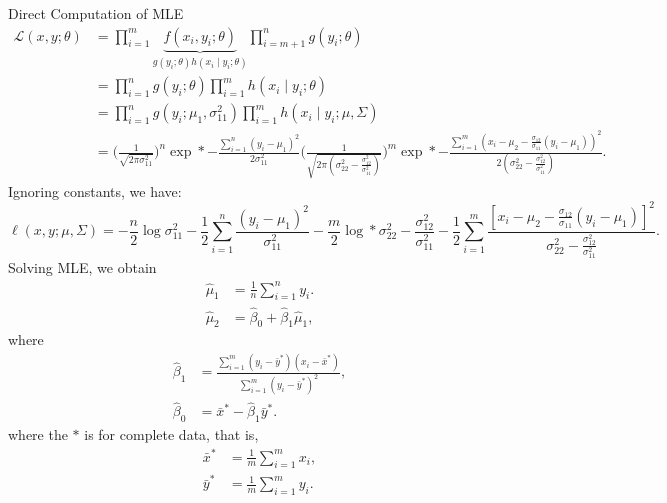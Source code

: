 \begin{Example}{Direct Computation of MLE}
    \begin{align*}
        \mathcal{L}(x,y;\theta)
         & =\prod_{i=1}^m \underbrace{f(x_i,y_i;\theta)}_{g(y_i;\theta)h(x_i\mid y_i;\theta)}
        \prod_{i=m+1}^{n}g(y_i;\theta)                                                        \\
         & =\prod_{i=1}^n g(y_i;\theta)\prod_{i=1}^{m}h(x_i\mid y_i;\theta)                   \\
         & =\prod_{i=1}^n g(y_i;\mu_1,\sigma_{11}^2)
        \prod_{i=1}^m h(x_i\mid y_i;\mu,\Sigma)                                               \\
         & =\biggl(\frac{1}{\sqrt{2\pi\sigma_{11}^2}}\biggr)^{\!n}
        \exp*{-\frac{\sum_{i=1}^{n}(y_i-\mu_1)^2}{2\sigma_{11}^2}}
        \Biggl(\frac{1}{\sqrt{2\pi(\sigma_{22}^2-\frac{\sigma_{12}^2}{\sigma_{11}^2})}}\Biggr)^{\!m}
        \exp*{-\frac{\sum_{i=1}^{m}(x_i-\mu_2-\frac{\sigma_{12}}{\sigma_{11}}(y_i-\mu_1))^2}{2(\sigma_{22}^2-\frac{\sigma_{12}^2}{\sigma_{11}^2})}}.
    \end{align*}
    Ignoring constants, we have:
    \begin{equation}\label{obslik}\tag*{(3)}
        \ell(x,y;\mu,\Sigma)
        =-\frac{n}{2}\log{\sigma_{11}^2}-\frac{1}{2}\sum_{i=1}^{n}\frac{(y_i-\mu_1)^2}{\sigma_{11}^2}
        -\frac{m}{2}\log*{\sigma_{22}^2-\frac{\sigma_{12}^2}{\sigma_{11}^2}}
        -\frac{1}{2}\sum_{i=1}^{m}\frac{[x_i-\mu_2-\frac{\sigma_{12}}{\sigma_{11}}(y_i-\mu_1)]^2}{\sigma_{22}^2-\frac{\sigma_{12}^2}{\sigma_{11}^2}}.
    \end{equation}
    Solving MLE, we obtain
    \begin{align*}
        \hat{\mu}_1 & =\frac{1}{n}\sum_{i=1}^{n}y_i.           \\
        \hat{\mu}_2 & =\hat{\beta}_0+\hat{\beta}_1\hat{\mu}_1,
    \end{align*}
    where
    \begin{align*}
        \hat{\beta}_1 & =\frac{\sum_{i=1}^{m}(y_i-\bar{y}^*)(x_i-\bar{x}^*)}{
        \sum_{i=1}^{m}(y_i-\bar{y}^*)^2},                                     \\
        \hat{\beta}_0 & =\bar{x}^*-\hat{\beta}_1\bar{y}^*.
    \end{align*}
    where the $*$ is for complete data, that is,
    \begin{align*}
        \bar{x}^* & =\frac{1}{m}\sum_{i=1}^{m}x_i, \\
        \bar{y}^* & =\frac{1}{m}\sum_{i=1}^{m}y_i.
    \end{align*}
\end{Example}
